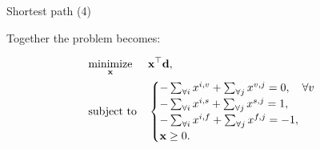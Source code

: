 \documentclass{beamer}
\begin{document}
\begin{frame}{Shortest path (4)}
	\begin{flushleft}
		
		
		Together the problem becomes:
		
		\begin{equation} \label{LP}
			\begin{aligned}
				& \underset{\mathbf{x}}{\text{minimize}}
				& & \mathbf{x}^\top \mathbf{d}, \\
				& \text{subject to}
				& & \begin{cases} 
					-\sum_{\forall i} x^{i,v} + \sum_{\forall j} x^{v,j} = 0, \ \ \ \forall v \\ 
					-\sum_{\forall i} x^{i,s} + \sum_{\forall j} x^{s,j} = 1,  \\
					-\sum_{\forall i} x^{i,f} + \sum_{\forall j} x^{f,j} = -1,\\
					\mathbf{x} \geq 0.
				\end{cases}
			\end{aligned}
		\end{equation}
		
	\end{flushleft}
\end{frame}



\myqrframe
\end{document}
